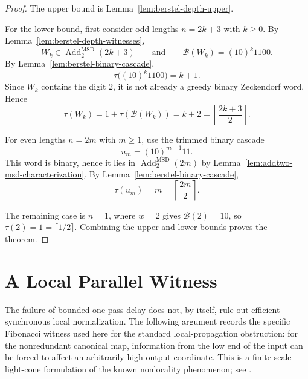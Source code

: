\documentclass[11pt,letterpaper]{article}
\numberwithin{equation}{section}
\theoremstyle{plain}
\theoremstyle{definition}
\theoremstyle{remark}
\newcommand{\AddTwo}{\operatorname{Add}_{2}}
\newcommand{\Berstel}{\mathcal{B}}
\begin{document}
\begin{proof}
The upper bound is Lemma~\ref{lem:berstel-depth-upper}.

For the lower bound, first consider odd lengths $n=2k+3$ with $k\ge 0$.  By
Lemma~\ref{lem:berstel-depth-witnesses},
\[
W_k\in\AddTwo^{\mathrm{MSD}}(2k+3)
\qquad\text{and}\qquad
\Berstel(W_k)=(10)^k1100.
\]
By Lemma~\ref{lem:berstel-binary-cascade},
\[
\tau\bigl((10)^k1100\bigr)=k+1.
\]
Since $W_k$ contains the digit $2$, it is not already a greedy binary
Zeckendorf word.  Hence
\[
\tau(W_k)=1+\tau(\Berstel(W_k))=k+2
=
\left\lceil\frac{2k+3}{2}\right\rceil.
\]

For even lengths $n=2m$ with $m\ge 1$, use the trimmed binary cascade
\[
u_m=(10)^{m-1}11.
\]
This word is binary, hence it lies in $\AddTwo^{\mathrm{MSD}}(2m)$ by
Lemma~\ref{lem:addtwo-msd-characterization}.  By
Lemma~\ref{lem:berstel-binary-cascade},
\[
\tau(u_m)=m
=
\left\lceil\frac{2m}{2}\right\rceil.
\]

The remaining case is $n=1$, where $w=2$ gives $\Berstel(2)=10$, so
$\tau(2)=1=\lceil 1/2\rceil$.
Combining the upper and lower bounds proves the theorem.
\end{proof}

\appendix
\section{A Local Parallel Witness}\label{sec:complexity}

The failure of bounded one-pass delay does not, by itself, rule out efficient
synchronous local normalization.  The following argument records the specific
Fibonacci witness used here for the standard local-propagation obstruction:
for the nonredundant canonical map, information from the low end of the input
can be forced to affect an arbitrarily high output coordinate.  This is a
finite-scale light-cone formulation of the known nonlocality phenomenon; see
\cite[Prop.~14]{Frougny1999OnlineAddition}.
\end{document}
